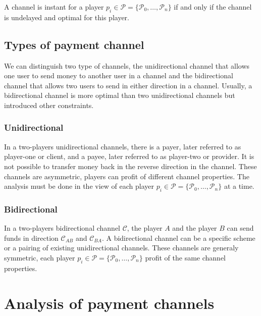 \begin{corollary}[Instant]
  A channel is instant for a player $p_i \in \mathcal{P} = \{\mathcal{P}_0, \dots,
  \mathcal{P}_n\}$ if and only if the channel is undelayed and optimal for this
  player.
\end{corollary}

\subsection{Types of payment channel}

We can distinguish two type of channels, the unidirectional channel that allows
one user to send money to another user in a channel and the bidirectional
channel that allows two users to send in either direction in a channel. Usually, a
bidirectional channel is more optimal than two unidirectional channels but
introduced other constraints.

\subsubsection{Unidirectional}

In a two-players unidirectional channels, there is a payer, later referred to as
player-one or client, and a payee, later referred to as player-two or provider.
It is not possible to transfer money back in the reverse direction in the
channel. These channels are asymmetric, players can profit of different channel
properties. The analysis must be done in the view of each player $p_i \in
\mathcal{P} = \{\mathcal{P}_0, \dots, \mathcal{P}_n\}$ at a time.

\subsubsection{Bidirectional}

In a two-players bidirectional channel $\mathcal{C}$, the player $A$ and the
player $B$ can send funds in direction $\mathcal{C}_{AB}$ and
$\mathcal{C}_{BA}$. A bidirectional channel can be a specific scheme or a
pairing of existing unidirectional channels. These channels are generaly
symmetric, each player $p_i \in \mathcal{P} = \{\mathcal{P}_0, \dots,
\mathcal{P}_n\}$ profit of the same channel properties.

\section{Analysis of payment channels}

